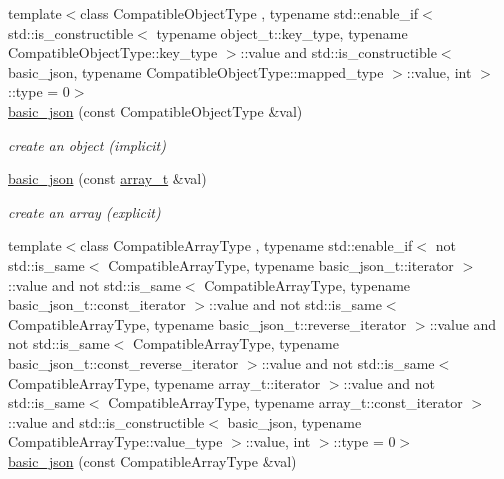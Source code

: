 \begin{DoxyCompactItemize}
{\footnotesize template$<$class Compatible\+Object\+Type , typename std\+::enable\+\_\+if$<$                                                                  std\+::is\+\_\+constructible$<$ typename object\+\_\+t\+::key\+\_\+type, typename Compatible\+Object\+Type\+::key\+\_\+type $>$\+::value and                                                               std\+::is\+\_\+constructible$<$ basic\+\_\+json, typename Compatible\+Object\+Type\+::mapped\+\_\+type $>$\+::value, int $>$\+::type  = 0$>$ }\\\hyperlink{a00025_ab7be2bc58ae0c2c2c30d40f15d6399f8}{basic\+\_\+json} (const Compatible\+Object\+Type \&val)
\begin{DoxyCompactList}\small\item\em create an object (implicit) \end{DoxyCompactList}\item 
\hyperlink{a00025_a3aaf41d385f0d9a93deb92f9b14ae0cf}{basic\+\_\+json} (const \hyperlink{a00025_ab00b882d39306d663c23dab110f5cae0}{array\+\_\+t} \&val)
\begin{DoxyCompactList}\small\item\em create an array (explicit) \end{DoxyCompactList}\item 
{\footnotesize template$<$class Compatible\+Array\+Type , typename std\+::enable\+\_\+if$<$                                                                  not std\+::is\+\_\+same$<$ Compatible\+Array\+Type, typename basic\+\_\+json\+\_\+t\+::iterator $>$\+::value and                                                               not std\+::is\+\_\+same$<$ Compatible\+Array\+Type, typename basic\+\_\+json\+\_\+t\+::const\+\_\+iterator $>$\+::value and                                                               not std\+::is\+\_\+same$<$ Compatible\+Array\+Type, typename basic\+\_\+json\+\_\+t\+::reverse\+\_\+iterator $>$\+::value and                                                               not std\+::is\+\_\+same$<$ Compatible\+Array\+Type, typename basic\+\_\+json\+\_\+t\+::const\+\_\+reverse\+\_\+iterator $>$\+::value and                                                               not std\+::is\+\_\+same$<$ Compatible\+Array\+Type, typename array\+\_\+t\+::iterator $>$\+::value and                                                               not std\+::is\+\_\+same$<$ Compatible\+Array\+Type, typename array\+\_\+t\+::const\+\_\+iterator $>$\+::value and                                                               std\+::is\+\_\+constructible$<$ basic\+\_\+json, typename Compatible\+Array\+Type\+::value\+\_\+type $>$\+::value, int $>$\+::type  = 0$>$ }\\\hyperlink{a00025_a81aaaab0f3b326afda2d226daab4f1e1}{basic\+\_\+json} (const Compatible\+Array\+Type \&val)

\end{DoxyCompactItemize}
